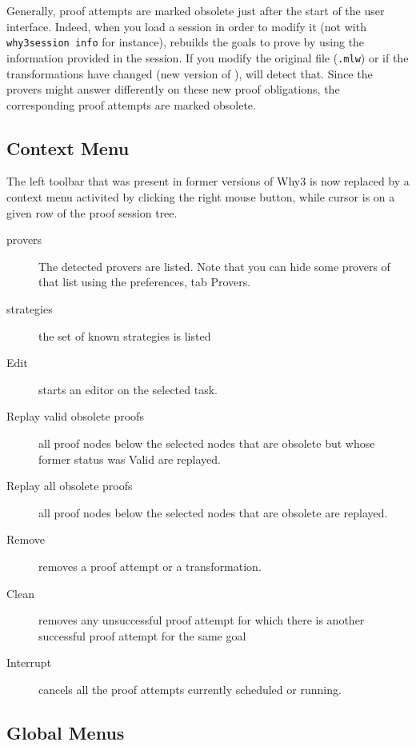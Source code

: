 Generally, proof attempts are marked obsolete just after
the start of the user interface. Indeed, when you load a session in order to
modify it (not with \texttt{why3session info} for instance), \why
rebuilds the goals to prove by using the information provided in the
session. If you modify the original file (\texttt{.mlw}) or if the
transformations have changed (new version of \why), \why will detect
that. Since the provers might answer differently on these new
proof obligations, the corresponding proof attempts are marked obsolete.

\subsection{Context Menu}

The left toolbar that was present in former versions of Why3 is now
replaced by a context menu activited by clicking the right mouse button,
while cursor is on a given row of the proof session tree.

\begin{description}
\item[provers] The detected provers are listed. Note that you can hide some provers of that list using the preferences, tab \textsf{Provers}.
\item[strategies] the set of known strategies is listed
\item[Edit] starts an editor on the selected task.
\item[Replay valid obsolete proofs] all proof nodes below the selected nodes that are obsolete but whose former status was Valid are replayed.
\item[Replay all obsolete proofs] all proof nodes below the selected nodes that are obsolete are replayed.
\item[Remove] removes a proof attempt or a transformation.
\item[Clean] removes any unsuccessful proof attempt for which there is
  another successful proof attempt for the same goal
\item[Interrupt] cancels all the proof attempts currently scheduled or running.
\end{description}

\subsection{Global Menus}

